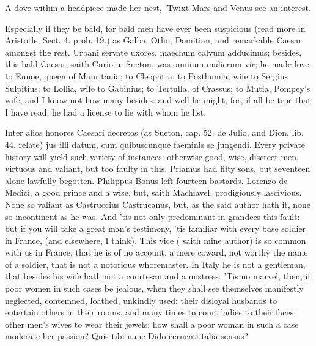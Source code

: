 {A dove within a headpiece made her nest,
'Twixt Mars and Venus see an interest.

Especially if they be bald, for bald men have ever been suspicious
(read more in Aristotle, Sect. 4. prob. 19.) as Galba, Otho, Domitian,
and remarkable Caesar amongst the rest. Urbani servate uxores,
maechum calvum adducimus; besides, this bald Caesar, saith Curio in
Sueton, was omnium mulierum vir; he made love to Eunoe, queen of
Mauritania; to Cleopatra; to Posthumia, wife to Sergius Sulpitius; to
Lollia, wife to Gabinius; to Tertulla, of Crassus; to Mutia, Pompey's
wife, and I know not how many besides: and well he might, for, if all
be true that I have read, he had a license to lie with whom he list.

Inter alios honores Caesari decretos (as Sueton, cap. 52. de Julio, and
Dion, lib. 44. relate) jus illi datum, cum quibuscunque faeminis se
jungendi. Every private history will yield such variety of instances:
otherwise good, wise, discreet men, virtuous and valiant, but too
faulty in this. Priamus had fifty sons, but seventeen alone lawfully
begotten. Philippus Bonus left fourteen bastards. Lorenzo de
Medici, a good prince and a wise, but, saith Machiavel,
prodigiously lascivious. None so valiant as Castruccius
Castrucanus, but, as the said author hath it, none so incontinent
as he was. And 'tis not only predominant in grandees this fault: but if
you will take a great man's testimony, 'tis familiar with every base
soldier in France, (and elsewhere, I think). This vice ( saith
mine author) is so common with us in France, that he is of no account,
a mere coward, not worthy the name of a soldier, that is not a
notorious whoremaster. In Italy he is not a gentleman, that besides his
wife hath not a courtesan and a mistress. 'Tis no marvel, then, if poor
women in such cases be jealous, when they shall see themselves
manifestly neglected, contemned, loathed, unkindly used: their disloyal
husbands to entertain others in their rooms, and many times to court
ladies to their faces: other men's wives to wear their jewels: how
shall a poor woman in such a case moderate her passion? Quis tibi
nunc Dido cernenti talia sensus?

}
